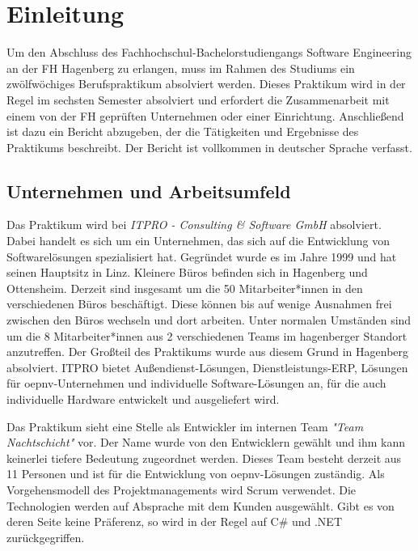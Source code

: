 \chapter{Einleitung}
\label{chap:einleitung}
    Um den Abschluss des Fachhochschul-Bachelorstudiengangs Software Engineering an
    der FH Hagenberg zu erlangen, muss im Rahmen des Studiums ein zwölfwöchiges Berufspraktikum absolviert werden. Dieses Praktikum wird in der Regel im sechsten
     Semester absolviert und erfordert die Zusammenarbeit mit einem von der FH geprüften
    Unternehmen oder einer Einrichtung. Anschließend ist dazu ein Bericht abzugeben, der
    die Tätigkeiten und Ergebnisse des Praktikums beschreibt. Der
    Bericht ist vollkommen in deutscher Sprache verfasst.

\section{Unternehmen und Arbeitsumfeld}\label{sec:unternehmen-und-arbeitsumfeld}
    Das Praktikum wird bei \emph{ITPRO - Consulting \& Software GmbH} \cite{ITPRO} absolviert. Dabei handelt es sich um ein Unternehmen, das sich auf die Entwicklung von Softwarelösungen 
    spezialisiert hat. Gegründet wurde es im Jahre 1999 und hat seinen Hauptsitz in Linz. Kleinere Büros befinden sich in Hagenberg und Ottensheim. Derzeit sind insgesamt um die 
    50 Mitarbeiter*innen in den verschiedenen Büros beschäftigt. Diese können bis auf wenige Ausnahmen frei zwischen den Büros wechseln und dort arbeiten. Unter normalen Umständen sind 
    um die 8 Mitarbeiter*innen  aus 2 verschiedenen Teams im hagenberger Standort anzutreffen.
    Der Großteil des Praktikums wurde aus diesem Grund in Hagenberg absolviert.
    ITPRO bietet Außendienst-Lösungen, Dienstleistungs-ERP, Lösungen für \gls{oepnv}-Unternehmen und individuelle Software-Lösungen an, für die auch individuelle Hardware entwickelt
    und ausgeliefert wird.

    Das Praktikum sieht eine Stelle als Entwickler im internen Team \emph{"Team Nachtschicht"} vor. Der Name wurde von den Entwicklern gewählt und ihm kann keinerlei tiefere Bedeutung zugeordnet werden.
    Dieses Team besteht derzeit aus 11 Personen und ist für die Entwicklung 
    von \gls{oepnv}-Lösungen zuständig. Als Vorgehensmodell des Projektmanagements wird Scrum verwendet. Die Technologien werden auf Absprache mit dem Kunden ausgewählt. Gibt es von deren Seite keine
    Präferenz, so wird in der Regel auf C\# und .NET zurückgegriffen.

